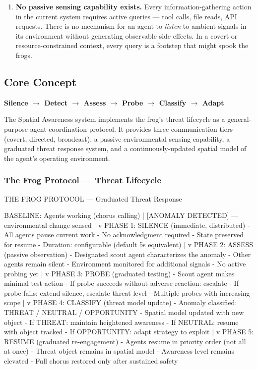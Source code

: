\documentclass[11pt,letterpaper]{article}
\begin{document}
\begin{enumerate}[leftmargin=2em]
\item \textbf{No passive sensing capability exists.} Every information-gathering action in the current system requires active queries --- tool calls, file reads, API requests. There is no mechanism for an agent to \textit{listen} to ambient signals in its environment without generating observable side effects. In a covert or resource-constrained context, every query is a footstep that might spook the frogs.
\end{enumerate}

\subsection{Core Concept}

\textbf{Silence $\rightarrow$ Detect $\rightarrow$ Assess $\rightarrow$ Probe $\rightarrow$ Classify $\rightarrow$ Adapt}

The Spatial Awareness system implements the frog's threat lifecycle as a general-purpose agent coordination protocol. It provides three communication tiers (covert, directed, broadcast), a passive environmental sensing capability, a graduated threat response system, and a continuously-updated spatial model of the agent's operating environment.

\subsubsection{The Frog Protocol --- Threat Lifecycle}

\begin{asciibox}
THE FROG PROTOCOL — Graduated Threat Response

  BASELINE: Agents working (chorus calling)
       |
  [ANOMALY DETECTED] — environmental change sensed
       |
       v
  PHASE 1: SILENCE (immediate, distributed)
    - All agents pause current work
    - No acknowledgment required
    - State preserved for resume
    - Duration: configurable (default 5s equivalent)
       |
       v
  PHASE 2: ASSESS (passive observation)
    - Designated scout agent characterizes the anomaly
    - Other agents remain silent
    - Environment monitored for additional signals
    - No active probing yet
       |
       v
  PHASE 3: PROBE (graduated testing)
    - Scout agent makes minimal test action
    - If probe succeeds without adverse reaction: escalate
    - If probe fails: extend silence, escalate threat level
    - Multiple probes with increasing scope
       |
       v
  PHASE 4: CLASSIFY (threat model update)
    - Anomaly classified: THREAT / NEUTRAL / OPPORTUNITY
    - Spatial model updated with new object
    - If THREAT: maintain heightened awareness
    - If NEUTRAL: resume with object tracked
    - If OPPORTUNITY: adapt strategy to exploit
       |
       v
  PHASE 5: RESUME (graduated re-engagement)
    - Agents resume in priority order (not all at once)
    - Threat object remains in spatial model
    - Awareness level remains elevated
    - Full chorus restored only after sustained safety
\end{asciibox}
\end{document}
